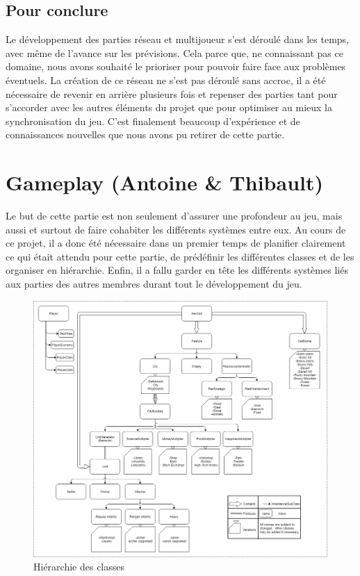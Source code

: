 \documentclass[12pt]{report}
\begin{document}
\subsection{Pour conclure}

Le développement des parties réseau et multijoueur s’est déroulé dans les temps,
avec même de l’avance sur les prévisions. Cela parce que, ne connaissant pas ce
domaine, nous avons souhaité le prioriser pour pouvoir faire face aux problèmes
éventuels. La création de ce réseau ne s’est pas déroulé sans accroc, il a été
nécessaire de revenir en arrière plusieurs fois et repenser des parties tant
pour s’accorder avec les autres éléments du projet que pour optimiser au mieux
la synchronisation du jeu. C’est finalement beaucoup d’expérience et de
connaissances nouvelles que nous avons pu retirer de cette partie.

\section{Gameplay (Antoine \& Thibault)}

Le but de cette partie est non seulement d’assurer une profondeur au jeu, mais
aussi et surtout de faire cohabiter les différents systèmes entre eux. Au cours
de ce projet, il a donc été nécessaire dans un premier temps de planifier
clairement ce qui était attendu pour cette partie, de prédéfinir les différentes
classes et de les organiser en hiérarchie. Enfin, il a fallu garder en tête les
différents systèmes liés aux parties des autres membres durant tout le
développement du jeu.

\begin{figure}[H]
    \centering
    \includegraphics[width=1\textwidth]{../report_1/img/class_hierarchy}
    \caption*{Hiérarchie des classes}
\end{figure}
\end{document}
